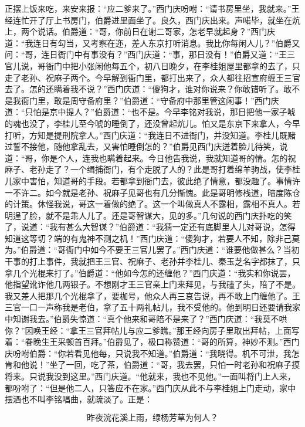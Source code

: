 正摆上饭来吃，来安来报：“应二爹来了。”西门庆吩咐：“请书房里坐，我就来。”王经连忙开了厅上书房门，伯爵进里面坐了。良久，西门庆出来。声喏毕，就坐在炕上，两个说话。伯爵道：“哥，你前日在谢二哥家，怎老早就起身？”西门庆道：“我连日有勾当，又考察在迩，差人东京打听消息。我比你每闲人儿？”伯爵又问：“哥，连日衙门中有事没有？”西门庆道：“事，那日没有！”伯爵又道：“王三官儿说，哥衙门中把小张闲他每五个，初八日晚夕，在李桂姐屋里都拿的去了，只走了老孙、祝麻子两个。今早解到衙门里，都打出来了，众人都往招宣府缠王三官去了。怎的还瞒着我不说？”西门庆道：“傻狗才，谁对你说来？你敢错听了。敢不是我衙门里，敢是周守备府里？”伯爵道：“守备府中那里管这闲事！”西门庆道：“只怕是京中提人？”伯爵道：“也不是。今早李铭对我说，那日把他一家子唬的魂也没了，李桂儿至今唬的睡倒了，还没曾起炕儿。怕又是东京下来拿人，今早打听，方知是提刑院拿人。”西门庆道：“我连日不进衙门，并没知道。李桂儿既赌过誓不接他，随他拿乱去，又害怕睡倒怎的？”伯爵见西门庆迸着脸儿待笑，说道：“哥，你是个人，连我也瞒着起来。今日他告我说，我就知道哥的情。怎的祝麻子、老孙走了？一个缉捕衙门，有个走脱了人的？此是哥打着绵羊驹\textMaLou 战，使李桂儿家中害怕，知道哥的手段。若都拿到衙门去，彼此绝了情意，都没趣了。事情许一不许二。如今就是老孙、祝麻子见哥也有几分惭愧。此是哥明修栈道，暗度陈仓的计策。休怪我说，哥这一着做的绝了。这一个叫做真人不露相，露相不真人。若明逞了脸，就不是乖人儿了。还是哥智谋大，见的多。”几句说的西门庆扑吃的笑了，说道：“我有甚么大智谋？”伯爵道：“我猜一定还有底脚里人儿对哥说，怎得知道这等切？端的有鬼神不测之机！”西门庆道：“傻狗才，若要人不知，除非己莫为。”伯爵道：“哥衙门中如今不要王三官儿罢了。”西门庆道：“谁要他做甚么？当初干事的打上事件，我就把王三官、祝麻子、老孙并李桂儿、秦玉芝名字都抹了，只拿几个光棍来打了。”伯爵道：“他如今怎的还缠他？”西门庆道：“我实和你说罢，他指望讹诈他几两银子。不想刚才王三官亲上门来拜见，与我磕了头，陪了不是。我又差人把那几个光棍拿了，要枷号，他众人再三哀告说，再不敢上门缠他了。王三官一口一声称我是老伯，拿了五十两礼帖儿，我不受他的。他到明日还要请我家中知谢我去。”伯爵失惊道：“真个他来和哥陪不是来了？”西门庆道：“我莫不哄你？”因唤王经：“拿王三官拜帖儿与应二爹瞧。”那王经向房子里取出拜帖，上面写着：“眷晚生王采顿首百拜。”伯爵见了，极口称赞道：“哥的所算，神妙不测。”西门庆吩咐伯爵：“你若看见他每，只说我不知道。”伯爵道：“我晓得。机不可泄，我怎肯和他说！”坐了一回，吃了茶，伯爵道：“哥，我去罢，只怕一时老孙和祝麻子摸将来。只说我没到这里。”西门庆道。“他就来，我也不见他。”一面叫将门上人来，都吩咐了：“但是他二人，只答应不在家。”西门庆从此不与李桂姐上门走动，家中摆酒也不叫李铭唱曲，就疏淡了。正是：

\[
昨夜浣花溪上雨，绿杨芳草为何人？
\]
